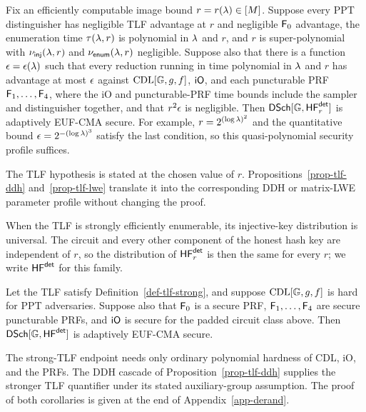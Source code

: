 \begin{corollary} \label{cor-der-adaptive}
Fix an efficiently computable image bound $r=r(\lambda)\in[M]$. Suppose every PPT distinguisher has negligible TLF advantage at $r$ and negligible $\mathsf{F}_0$ advantage, the enumeration time $\tau(\lambda,r)$ is polynomial in $\lambda$ and $r$, and $r$ is super-polynomial with $\nu_{\mathsf{inj}}(\lambda,r)$ and $\nu_{\mathsf{enum}}(\lambda,r)$ negligible. Suppose also that there is a function $\epsilon=\epsilon(\lambda)$ such that every reduction running in time polynomial in $\lambda$ and $r$ has advantage at most $\epsilon$ against $\text{CDL}[\mathbb{G},g,f]$, $\mathsf{iO}$, and each puncturable PRF $\mathsf{F}_1,\ldots,\mathsf{F}_4$, where the iO and puncturable-PRF time bounds include the sampler and distinguisher together, and that $r^2\epsilon$ is negligible. Then $\mathsf{DSch}[\mathbb{G},\mathsf{HF}^{\mathsf{det}}_r]$ is adaptively EUF-CMA secure. For example, $r=2^{(\log\lambda)^2}$ and the quantitative bound $\epsilon=2^{-(\log\lambda)^3}$ satisfy the last condition, so this quasi-polynomial security profile suffices.
\end{corollary}

The TLF hypothesis is stated at the chosen value of $r$. Propositions~\ref{prop-tlf-ddh} and~\ref{prop-tlf-lwe} translate it into the corresponding DDH or matrix-LWE parameter profile without changing the proof.

When the TLF is strongly efficiently enumerable, its injective-key distribution is universal. The circuit and every other component of the honest hash key are independent of $r$, so the distribution of $\mathsf{HF}^{\mathsf{det}}_r$ is then the same for every $r$; we write $\mathsf{HF}^{\mathsf{det}}$ for this family.

\begin{corollary} \label{cor-der-adaptive-strong}
Let the TLF satisfy Definition~\ref{def-tlf-strong}, and suppose $\text{CDL}[\mathbb{G},g,f]$ is hard for PPT adversaries. Suppose also that $\mathsf{F}_0$ is a secure PRF, $\mathsf{F}_1,\ldots,\mathsf{F}_4$ are secure puncturable PRFs, and $\mathsf{iO}$ is secure for the padded circuit class above. Then $\mathsf{DSch}[\mathbb{G},\mathsf{HF}^{\mathsf{det}}]$ is adaptively EUF-CMA secure.
\end{corollary}

The strong-TLF endpoint needs only ordinary polynomial hardness of CDL, iO, and the PRFs. The DDH cascade of Proposition~\ref{prop-tlf-ddh} supplies the stronger TLF quantifier under its stated auxiliary-group assumption. The proof of both corollaries is given at the end of Appendix~\ref{app-derand}.

